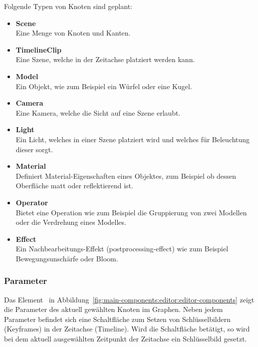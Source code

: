 Folgende Typen von Knoten sind geplant:
\begin{itemize}
    \item \textbf{Scene}\\
        Eine Menge von Knoten und Kanten.

    \item \textbf{TimelineClip}\\
        Eine Szene, welche in der Zeitachse platziert werden kann.

    \item \textbf{Model}\\
        Ein Objekt, wie zum Beispiel ein Würfel oder eine Kugel.

    \item \textbf{Camera}\\
        Eine Kamera, welche die Sicht auf eine Szene erlaubt.

    \item \textbf{Light}\\
        Ein Licht, welches in einer Szene platziert wird und welches für
        Beleuchtung dieser sorgt.

    \item \textbf{Material}\\
        Definiert Material-Eigenschaften eines Objektes, zum Beispiel ob dessen
        Oberfläche matt oder reflektierend ist.

    \item \textbf{Operator}\\
        Bietet eine Operation wie zum Beispiel die Gruppierung von zwei
        Modellen oder die Verdrehung eines Modelles.

    \item \textbf{Effect}\\
        Ein Nachbearbeitungs-Effekt (postprocessing-effect) wie zum Beispiel
        Bewegungsunschärfe oder Bloom.
\end{itemize}

\subsubsection{Parameter}
\label{ssubsec:main-components:editor:parameters}

Das Element~ in
Abbildung~\ref{fig:main-components:editor:editor-components} zeigt die
Parameter des aktuell gewählten Knoten im Graphen. Neben jedem Parameter
befindet sich eine Schaltfläche zum Setzen von Schlüsselbildern (Keyframes) in
der Zeitachse (Timeline). Wird die Schaltfläche betätigt, so wird bei dem
aktuell ausgewählten Zeitpunkt der Zeitachse ein Schlüsselbild gesetzt.

